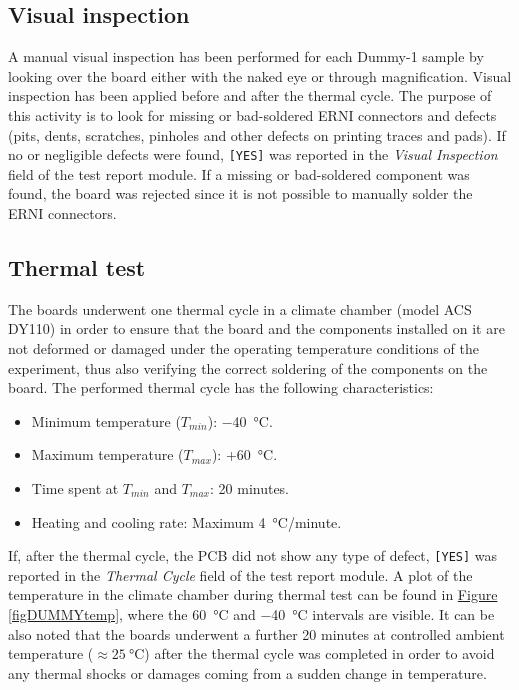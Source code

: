 
\subsection{Visual inspection}
A manual visual inspection has been performed for each Dummy-1 sample by looking over the board either with the naked eye or through magnification. Visual inspection has been applied before and after the thermal cycle. The purpose of this activity is to look for missing or bad-soldered ERNI connectors and defects (pits, dents, scratches, pinholes and other defects on printing traces and pads). If no or negligible defects were found, \texttt{[YES]} was reported in the \textit{Visual Inspection} field of the test report module. If a missing or bad-soldered component was found, the board was rejected since it is not possible to manually solder the ERNI connectors.


\subsection{Thermal test} \label{subsection-thermal}
The boards underwent one thermal cycle in a climate chamber (model ACS DY110) in order to ensure that the board and the components installed on it are not deformed or damaged under the operating temperature conditions of the experiment, thus also verifying the correct soldering of the components on the board. The performed thermal cycle has the following characteristics:

\begin{itemize}
    \itemsep0em 
    \item Minimum temperature (\texttt{$T_{min}$}): \SI{-40}{\celsius}.
    \item Maximum temperature (\texttt{$T_{max}$}): +\SI{60}{\celsius}.
    \item Time spent at $T_{min}$ and $T_{max}$: 20 minutes.
    \item Heating and cooling rate: Maximum \SI{4}{\celsius/minute}.
\end{itemize}

\noindent
If, after the thermal cycle, the PCB did not show any type of defect, \texttt{[YES]} was reported in the \textit{Thermal Cycle} field of the test report module. A plot of the temperature in the climate chamber during thermal test can be found in \hyperref[figDUMMYtest]{Figure \ref{figDUMMYtemp}}, where the \SI{60}{\celsius} and \SI{-40}{\celsius} intervals are visible. It can be also noted that the boards underwent a further 20 minutes at controlled ambient temperature ($\approx\SI{25}{\celsius}$) after the thermal cycle was completed in order to avoid any thermal shocks or damages coming from a sudden change in temperature.

